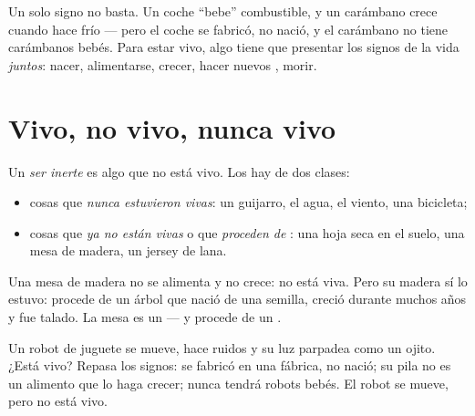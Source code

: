 \begin{remark}\label{rem:g1:living-or-not:allsigns}
Un solo signo no basta. Un coche ``bebe'' combustible, y un carámbano
crece cuando hace frío --- pero el coche se fabricó, no nació, y el
carámbano no tiene carámbanos bebés. Para estar vivo, algo tiene que
presentar los signos de la vida \emph{juntos}: nacer, alimentarse,
crecer, hacer nuevos , morir.
\end{remark}

\section{Vivo, no vivo, nunca vivo}

\begin{definition}\label{def:g1:living-or-not:nonliving}
Un \emph{ser inerte} es algo que no está vivo.
Los hay de dos clases:
\begin{itemize}
  \item cosas que \emph{nunca estuvieron vivas}: un guijarro, el agua, el viento, una bicicleta;
  \item cosas que \emph{ya no están vivas} o
        que \emph{proceden de} : una hoja seca en el
        suelo, una mesa de madera, un jersey de lana.
\end{itemize}
\end{definition}

\begin{example}\label{ex:g1:living-or-not:table}
Una mesa de madera no se alimenta y no crece: no está viva. Pero su
madera sí lo estuvo: procede de un árbol que nació de una semilla,
creció durante muchos años y fue talado. La mesa es un 
--- y procede de un .
\end{example}

\begin{example}[¿Y un robot?]\label{ex:g1:living-or-not:robot}
Un robot de juguete se mueve, hace ruidos y su luz parpadea como un
ojito. ¿Está vivo? Repasa los signos: se fabricó en una fábrica, no
nació; su pila no es un alimento que lo haga crecer; nunca tendrá
robots bebés. El robot se mueve, pero no está vivo.
\end{example}

